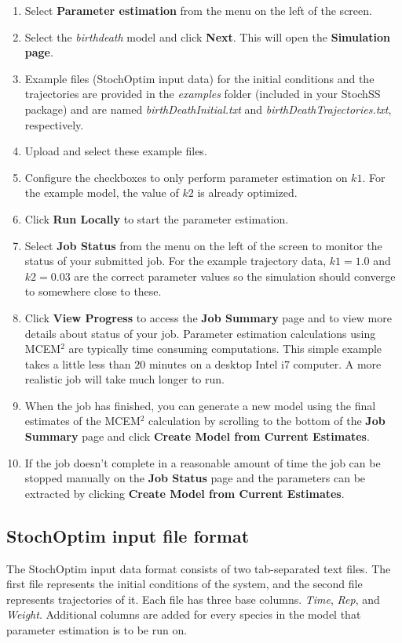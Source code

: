 \begin{enumerate}
\item Select \textbf{Parameter estimation} from the menu on the left of the screen.
\item Select the \textit{birthdeath} model and click \textbf{Next}. This will open the \textbf{Simulation page}.
\item Example files (StochOptim input data) for the initial conditions and the trajectories are provided in the \textit{examples} folder (included in your StochSS package) and are named \textit{birthDeathInitial.txt} and \textit{birthDeathTrajectories.txt}, respectively.
\item Upload and select these example files.
\item Configure the checkboxes to only perform parameter estimation on $k1$. For the example model, the value of $k2$ is already optimized.
\item Click \textbf{Run Locally} to start the parameter estimation.
\item Select \textbf{Job Status} from the menu on the left of the screen to monitor the status of your submitted job. For the example trajectory data, $k1 = 1.0$ and $k2 = 0.03$ are the correct parameter values so the simulation should converge to somewhere close to these.
\item Click \textbf{View Progress} to access the \textbf{Job Summary} page and to view more details about status of your job. Parameter estimation calculations using MCEM$^2$ are typically time consuming computations. This simple example takes a little less than $20$ minutes on a desktop Intel i7 computer. A more realistic job will take much longer to run.
\item When the job has finished, you can generate a new model using the final estimates of the MCEM$^2$ calculation by scrolling to the bottom of the \textbf{Job Summary} page and click \textbf{Create Model from Current Estimates}.
\item If the job doesn't complete in a reasonable amount of time the job can be stopped manually on the \textbf{Job Status} page and the parameters can be extracted by clicking \textbf{Create Model from Current Estimates}.
\end{enumerate}

\subsection{StochOptim input file format}
The StochOptim input data format consists of two tab-separated text files.
The first file represents the initial conditions of the system, and the second file represents trajectories of it.
Each file has three base columns. \textit{Time}, \textit{Rep}, and \textit{Weight}. Additional columns are added for every species in the model that parameter estimation is to be run on.

